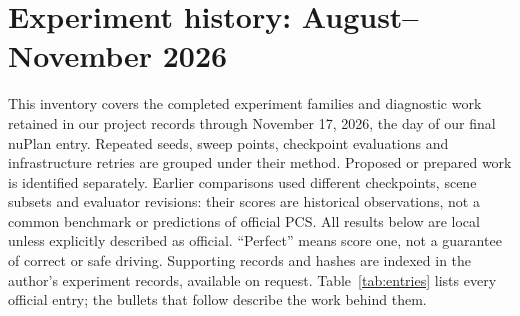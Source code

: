 \section{Experiment history: August--November 2026}\label{app:history}
This inventory covers the completed experiment families and diagnostic work retained in our project records through November 17, 2026, the day of our final nuPlan entry. Repeated seeds, sweep points, checkpoint evaluations and infrastructure retries are grouped under their method. Proposed or prepared work is identified separately. Earlier comparisons used different checkpoints, scene subsets and evaluator revisions: their scores are historical observations, not a common benchmark or predictions of official PCS. All results below are local unless explicitly described as official. ``Perfect'' means score one, not a guarantee of correct or safe driving. Supporting records and hashes are indexed in the author's experiment records, available on request. Table~\ref{tab:entries} lists every official entry; the bullets that follow describe the work behind them.

